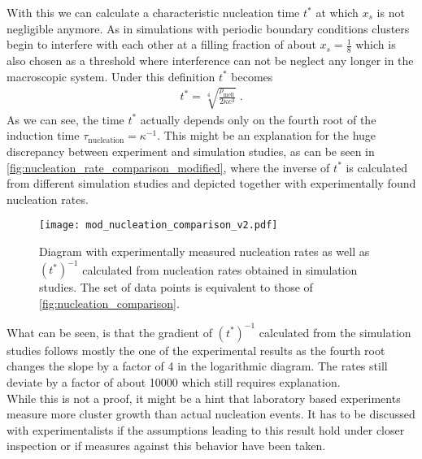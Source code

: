 With this we can calculate a characteristic nucleation time $t^*$ at which $x_s$ is not negligible anymore. As in simulations with periodic boundary conditions clusters begin to interfere with each other at a filling fraction of about $x_s=\frac{1}{8}$ which is also chosen as a threshold where interference can not be neglect any longer in the macroscopic system. Under this definition $t^*$ becomes
\begin{align}
\label{eqn:nucleation_time_modified}
t^* = \sqrt[4]{\frac{\rho_{\text{melt}}}{2 \kappa c^3 }} \; \text{.}
\end{align}
As we can see, the time $t^*$ actually depends only on the fourth root of the induction time $\tau_{\text{nucleation}} = \kappa^{-1}$. This might be an explanation for the huge discrepancy between experiment and simulation studies, as can be seen in \autoref{fig:nucleation_rate_comparison_modified}, where the inverse of $t^*$ is calculated from different simulation studies and depicted together with experimentally found nucleation rates.\\
\begin{figure}[h]
\centering
\texttt{[image: mod\_nucleation\_comparison\_v2.pdf]}
\caption[Nucleation rate comparison under assumption of early filled boxes]{Diagram with experimentally measured nucleation rates\cite{Harland1997,He1996,schaetzel1993,Sinn2001,Auer2001} as well as $(t^*)^{-1}$ calculated from nucleation rates obtained in simulation studies\cite{Filion2010a,Fiorucci2020a,Schilling2011}. The set of data points is equivalent to those of \autoref{fig:nucleation_comparison}.}
\label{fig:nucleation_rate_comparison_modified}
\end{figure}

What can be seen, is that the gradient of $(t^*)^{-1}$ calculated from the simulation studies follows mostly the one of the experimental results as the fourth root changes the slope by a factor of 4 in the logarithmic diagram. The rates still deviate by a factor of about 10000 which still requires explanation.\\

While this is not a proof, it might be a hint that laboratory based experiments measure more cluster growth than actual nucleation events. It has to be discussed with experimentalists if the assumptions leading to this result hold under closer inspection or if measures against this behavior have been taken.

